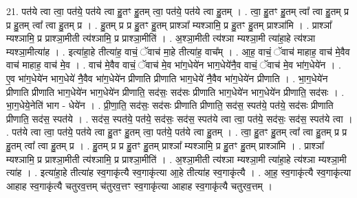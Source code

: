 \documentclass[17pt]{extarticle}
\begin{document}
21. पत॑ये त्वा त्वा॒ पत॑ये॒ पत॑ये त्वा हु॒तꣳ हु॒तम् त्वा॒ पत॑ये॒ पत॑ये त्वा हु॒तम् । . त्वा॒ हु॒तꣳ हु॒तम् त्वा᳚ त्वा हु॒तम् प्र प्र हु॒तम् त्वा᳚ त्वा हु॒तम् प्र । . हु॒तम् प्र प्र हु॒तꣳ हु॒तम् प्राश्ञा᳚ म्यश्ञामि॒ प्र हु॒तꣳ हु॒तम् प्राश्ञा॑मि । . प्राश्ञा᳚ म्यश्ञामि॒ प्र प्राश्ञा॒मीती त्य॑श्ञामि॒ प्र प्राश्ञा॒मीति॑ । . अ॒श्ञा॒मीती त्य॑श्ञा म्यश्ञा॒मी त्या॑हा॒हे त्य॑श्ञा म्यश्ञा॒मीत्या॑ह । . इत्या॑हा॒हे तीत्या॑ह॒ वाचं॒ ॅवाच॑ मा॒हे तीत्या॑ह॒ वाच᳚म् । . आ॒ह॒ वाचं॒ ॅवाच॑ माहाह॒ वाच॑ मे॒वैव वाच॑ माहाह॒ वाच॑ मे॒व । . वाच॑ मे॒वैव वाचं॒ ॅवाच॑ मे॒व भा॑ग॒धेये॑न भाग॒धेये॑नै॒व वाचं॒ ॅवाच॑ मे॒व भा॑ग॒धेये॑न । . ए॒व भा॑ग॒धेये॑न भाग॒धेये॑ नै॒वैव भा॑ग॒धेये॑न प्रीणाति प्रीणाति भाग॒धेये॑ नै॒वैव भा॑ग॒धेये॑न प्रीणाति । . भा॒ग॒धेये॑न प्रीणाति प्रीणाति भाग॒धेये॑न भाग॒धेये॑न प्रीणाति॒ सद॑सः॒ सद॑सः प्रीणाति भाग॒धेये॑न भाग॒धेये॑न प्रीणाति॒ सद॑सः । . भा॒ग॒धेये॒नेति॑ भाग - धेये॑न । . प्री॒णा॒ति॒ सद॑सः॒ सद॑सः प्रीणाति प्रीणाति॒ सद॑स॒ स्पत॑ये॒ पत॑ये॒ सद॑सः प्रीणाति प्रीणाति॒ सद॑स॒ स्पत॑ये । . सद॑स॒ स्पत॑ये॒ पत॑ये॒ सद॑सः॒ सद॑स॒ स्पत॑ये त्वा त्वा॒ पत॑ये॒ सद॑सः॒ सद॑स॒ स्पत॑ये त्वा । . पत॑ये त्वा त्वा॒ पत॑ये॒ पत॑ये त्वा हु॒तꣳ हु॒तम् त्वा॒ पत॑ये॒ पत॑ये त्वा हु॒तम् । . त्वा॒ हु॒तꣳ हु॒तम् त्वा᳚ त्वा हु॒तम् प्र प्र हु॒तम् त्वा᳚ त्वा हु॒तम् प्र । . हु॒तम् प्र प्र हु॒तꣳ हु॒तम् प्राश्ञा᳚ म्यश्ञामि॒ प्र हु॒तꣳ हु॒तम् प्राश्ञा॑मि । . प्राश्ञा᳚ म्यश्ञामि॒ प्र प्राश्ञा॒मीती त्य॑श्ञामि॒ प्र प्राश्ञा॒मीति॑ । . अ॒श्ञा॒मीती त्य॑श्ञा म्यश्ञा॒मी त्या॑हा॒हे त्य॑श्ञा म्यश्ञा॒मी त्या॑ह । . इत्या॑हा॒हे तीत्या॑ह स्व॒गाकृ॑त्यै स्व॒गाकृ॑त्या आ॒हे तीत्या॑ह स्व॒गाकृ॑त्यै । . आ॒ह॒ स्व॒गाकृ॑त्यै स्व॒गाकृ॑त्या आहाह स्व॒गाकृ॑त्यै चतुरव॒त्तम् च॑तुरव॒त्तꣳ स्व॒गाकृ॑त्या आहाह स्व॒गाकृ॑त्यै चतुरव॒त्तम् । \newline
\end{document}
